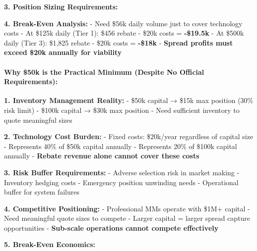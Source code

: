 \textbf{3. Position Sizing Requirements:}

\begin{Shaded}
\begin{Highlighting}[]
\OperatorTok{=}\OperatorTok{*} 
\end{Highlighting}
\end{Shaded}

\textbf{4. Break-Even Analysis:} - Need \$56k daily volume just to cover
technology costs - At \$125k daily (Tier 1): \$456 rebate - \$20k costs
= \textbf{-\$19.5k} - At \$500k daily (Tier 3): \$1,825 rebate - \$20k
costs = \textbf{-\$18k} - \textbf{Spread profits must exceed \$20k
annually for viability}

\hypertarget{why-50k-is-the-practical-minimum-despite-no-official-requirements}{%
\paragraph{\texorpdfstring{\textbf{Why \$50k is the Practical Minimum
(Despite No Official
Requirements):}}{Why \$50k is the Practical Minimum (Despite No Official Requirements):}}\label{why-50k-is-the-practical-minimum-despite-no-official-requirements}}

\textbf{1. Inventory Management Reality:} - \$50k capital → \$15k max
position (30\% risk limit) - \$100k capital → \$30k max position - Need
sufficient inventory to quote meaningful sizes

\textbf{2. Technology Cost Burden:} - Fixed costs: \$20k/year regardless
of capital size - Represents 40\% of \$50k capital annually - Represents
20\% of \$100k capital annually - \textbf{Rebate revenue alone cannot
cover these costs}

\textbf{3. Risk Buffer Requirements:} - Adverse selection risk in market
making - Inventory hedging costs - Emergency position unwinding needs -
Operational buffer for system failures

\textbf{4. Competitive Positioning:} - Professional MMs operate with
\$1M+ capital - Need meaningful quote sizes to compete - Larger capital
= larger spread capture opportunities - \textbf{Sub-scale operations
cannot compete effectively}

\textbf{5. Break-Even Economics:}


